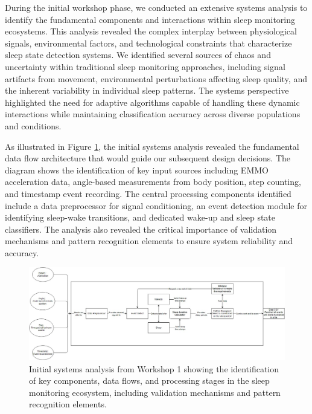 \documentclass[conference]{IEEEtran}
\begin{document}
During the initial workshop phase, we conducted an extensive systems analysis to identify the fundamental components and interactions within sleep monitoring ecosystems. This analysis revealed the complex interplay between physiological signals, environmental factors, and technological constraints that characterize sleep state detection systems. We identified several sources of chaos and uncertainty within traditional sleep monitoring approaches, including signal artifacts from movement, environmental perturbations affecting sleep quality, and the inherent variability in individual sleep patterns. The systems perspective highlighted the need for adaptive algorithms capable of handling these dynamic interactions while maintaining classification accuracy across diverse populations and conditions.

As illustrated in Figure \ref{fig:workshop1_analysis}, the initial systems analysis revealed the fundamental data flow architecture that would guide our subsequent design decisions. The diagram shows the identification of key input sources including EMMO acceleration data, angle-based measurements from body position, step counting, and timestamp event recording. The central processing components identified include a data preprocessor for signal conditioning, an event detection module for identifying sleep-wake transitions, and dedicated wake-up and sleep state classifiers. The analysis also revealed the critical importance of validation mechanisms and pattern recognition elements to ensure system reliability and accuracy.

\begin{figure}[htbp]
\centering
\includegraphics[width=\columnwidth]{system_analysis_workshop1.png}
\caption{Initial systems analysis from Workshop 1 showing the identification of key components, data flows, and processing stages in the sleep monitoring ecosystem, including validation mechanisms and pattern recognition elements.}
\label{fig:workshop1_analysis}
\end{figure}
\end{document}
